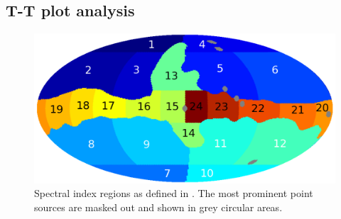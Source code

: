 \documentclass[twocolumn]{../../common/aa}
\begin{document}
\subsection{T-T plot analysis}
\label{sec:tt_plot}

\begin{figure}
        \centering
        \includegraphics[width=\linewidth]{figures/utnymaske_tall_converted.pdf}
        \caption{Spectral index regions as defined in \citet{fuskeland2014}. The most prominent point sources are masked out and shown in grey circular areas.
        }
        \label{fig:regions}
\end{figure}
\end{document}
